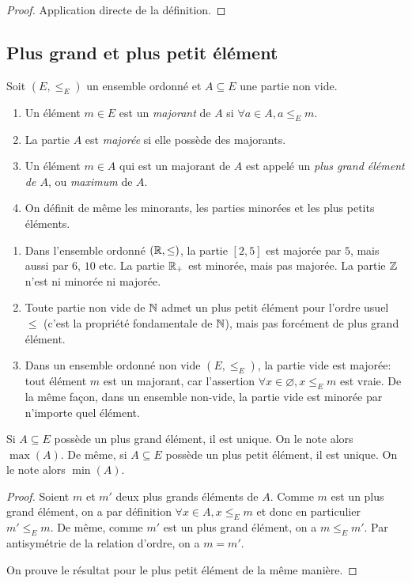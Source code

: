 \begin{proof}
Application directe de la définition.
\end{proof}

\subsection{Plus grand et plus petit élément}
\begin{definition}
Soit $(E,\leq_E)$ un ensemble ordonné et $A\subseteq E$ une partie non vide.
\begin{enumerate}
\item Un élément $m\in E$ est un \emph{majorant} de $A$ si $\forall a\in A, a\leq_E m$.
\item La partie $A$ est \emph{majorée} si elle possède des majorants.
\item Un élément $m\in A$ qui est un majorant de $A$ est appelé un \emph{plus grand élément de $A$}, ou \emph{maximum} de $A$.
\item On définit de même les minorants, les parties minorées et les plus petits éléments.
\end{enumerate}
\end{definition}

\begin{exemple}
\begin{enumerate}[label=\alph*)]
\item Dans l'ensemble ordonné $(\mathbb{R},\leq)$, la partie $[2,5]$ est majorée par $5$, mais aussi par $6$, $10$ etc. La partie $\mathbb{R}_+$ est minorée, mais pas majorée. La partie $\mathbb{Z}$ n'est ni minorée ni majorée.
\item Toute partie non vide de $\mathbb{N}$ admet un plus petit élément pour l'ordre usuel $\leq$ (c'est la propriété fondamentale de $\mathbb{N}$), mais pas forcément de plus grand élément.
\item Dans un ensemble ordonné non vide $(E,\leq_E)$, la partie vide est majorée: tout élément $m$ est un majorant, car l'assertion $\forall x\in \varnothing, x\leq_E m$ est vraie. De la même façon, dans un ensemble non-vide, la partie vide est minorée par n'importe quel élément.
\end{enumerate}
\end{exemple}



\begin{proposition}
Si $A\subseteq E$ possède un plus grand élément, il est unique. On le note alors $\max(A)$.
De même, si $A\subseteq E$ possède un plus petit élément, il est unique. On le note alors $\min(A)$.
\end{proposition}
\begin{proof}
Soient $m$ et $m'$ deux plus grands éléments de $A$. Comme $m$ est un plus grand élément, on a par définition $\forall x\in A, x\leq_E m$ et donc en particulier $m'\leq_E m$. De même, comme $m'$ est un plus grand élément, on a $m\leq_E m'$. Par antisymétrie de la relation d'ordre, on a $m=m'$.

On prouve le résultat pour le plus petit élément de la même manière.
\end{proof}

